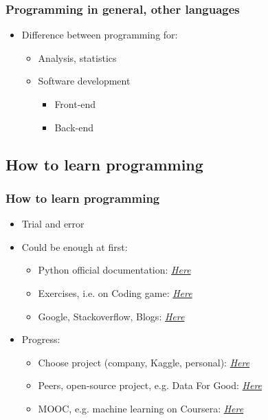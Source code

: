 \begin{frame}\frametitle{Programming in general, other languages}

   \begin{itemize}
      \item Difference between programming for:
      \begin{itemize}
         \item Analysis, statistics
         \item Software development
         \begin{itemize}
            \item Front-end
            \item Back-end
         \end{itemize}
      \end{itemize}
   \end{itemize}

\end{frame}

\subsection{How to learn programming}

\begin{frame}\frametitle{How to learn programming}
   \begin{itemize}
      \item Trial and error
      \item Could be enough at first:
      \begin{itemize}
         \item Python official documentation: \textit{\href{https://docs.python.org/3/library/}{Here}}
         \item Exercises, i.e. on Coding game: \textit{\href{https://www.codingame.com/home}{Here}}
         \item Google, Stackoverflow, Blogs: \textit{\href{https://towardsdatascience.com/}{Here}}
      \end{itemize}
      
      \item Progress:
      \begin{itemize}
         \item Choose project (company, Kaggle, personal): \textit{\href{https://www.kaggle.com/}{Here}}
         \item Peers, open-source project, e.g. Data For Good: \textit{\href{https://dataforgood.fr/projects/}{Here}}
         \item MOOC, e.g. machine learning on Coursera: \textit{\href{https://fr.coursera.org/learn/machine-learning}{Here}}
      \end{itemize}
   \end{itemize}
\end{frame}


